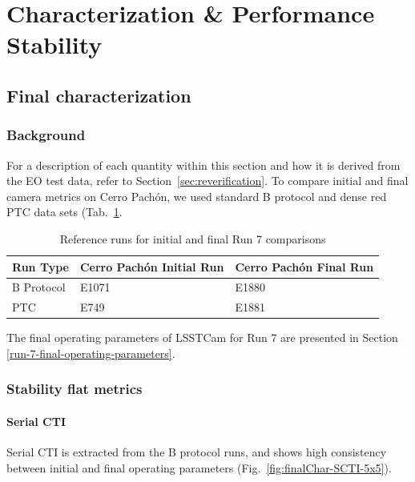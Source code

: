 

\clearpage

\section{Characterization \& Performance Stability}\label{characterization-camera-stability}



\subsection{Final characterization}\label{sec:finalCharacterization}
\subsubsection{Background}\label{final_background}

For a description of each quantity within this section and how it is derived from the EO test data, refer to Section~\ref{sec:reverification}. To compare initial and final camera metrics on Cerro Pachón, we used standard B protocol and dense red PTC data sets (Tab.~\ref{tab:runTable}.

\begin{table}[ht]
\centering
\caption{Reference runs for initial and final Run 7 comparisons}
\label{tab:runTable}
\begin{tabular}{|l|l|l|}
\hline
\textbf{Run Type} & \textbf{Cerro Pachón Initial Run} & \textbf{Cerro Pachón Final Run} \\ \hline
B Protocol & E1071 & E1880 \\ \hline
PTC        & E749  & E1881 \\ \hline
\end{tabular}
\end{table}


The final operating parameters of LSSTCam for Run 7 are presented in Section \ref{run-7-final-operating-parameters}.

\subsubsection{Stability flat metrics}\label{sec:finalstability-flat-metrics}

\paragraph{Serial CTI}\label{sec:finalChar-serial-cti}

Serial CTI is extracted from the B protocol runs, and shows high consistency between initial and final operating parameters (Fig.~\ref{fig:finalChar-SCTI-5x5}).

